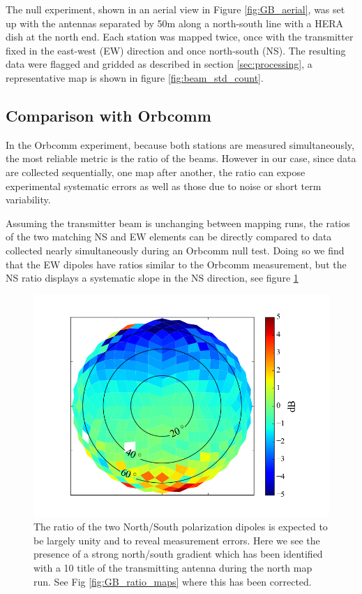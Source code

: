 \documentclass[preprint2,numberedappendix,tighten,twocolappendix]{aastex6}
\begin{document}
The null experiment, shown in an aerial view in Figure \ref{fig:GB_aerial}, was set up with the antennas separated by 50m along a north-south line with a HERA dish at the north end.  Each station was mapped twice, once with the transmitter fixed in the east-west (EW) direction and once north-south (NS).  The resulting data were flagged and gridded as described in section \ref{sec:processing}, a representative map is shown in figure \ref{fig:beam_std_count}. 




\subsection{Comparison with Orbcomm}
\label{sec:orbcomm}
In the Orbcomm experiment, because both stations are measured simultaneously,  the most reliable metric is the ratio of the beams. However in our case, since data are collected sequentially, one map after another, the ratio can expose experimental systematic errors as well as those due to noise or short term variability.

Assuming the transmitter beam is unchanging between mapping runs, the ratios of the two matching NS and EW elements can be directly compared to data collected nearly simultaneously during an Orbcomm null test.   Doing so we find that the EW dipoles have ratios similar to the Orbcomm measurement, but the NS ratio displays a systematic slope in the NS direction, see figure \ref{fig:GB_NS_ratio_uncalibrated}
\begin{figure}
\includegraphics[width=\columnwidth]{figures/GB_NS_ratio_uncalibrated.png}
\caption{The ratio of the two North/South polarization dipoles is expected to be largely unity and to reveal measurement errors. Here we see the presence of a strong north/south gradient which has been identified with a 10\arcdeg{} title of the transmitting antenna during the north map run. See Fig \ref{fig:GB_ratio_maps} where this has been corrected. }\label{fig:GB_NS_ratio_uncalibrated}
\end{figure}
\end{document}
